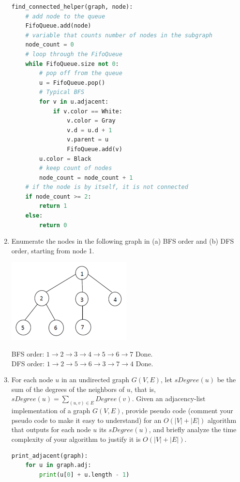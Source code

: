 \documentclass{article}
\begin{document}
\begin{enumerate}
\begin{lstlisting}[language=python]
find_connected_helper(graph, node):
    # add node to the queue
    FifoQueue.add(node)
    # variable that counts number of nodes in the subgraph
    node_count = 0
    # loop through the FifoQueue
    while FifoQueue.size not 0:
        # pop off from the queue
        u = FifoQueue.pop()
        # Typical BFS 
        for v in u.adjacent:
            if v.color == White:
                v.color = Gray
                v.d = u.d + 1
                v.parent = u
                FifoQueue.add(v)
        u.color = Black
        # keep count of nodes
        node_count = node_count + 1
    # if the node is by itself, it is not connected
    if node_count >= 2:
        return 1
    else:
        return 0
            \end{lstlisting}
        \item Enumerate the nodes in the following graph in (a) BFS order and 
        (b) DFS order, starting from node 1. 
            \begin{center}
                \includegraphics{tree1}
            \end{center}
            BFS order: $1 \rightarrow 2 \rightarrow 3 \rightarrow 4 \rightarrow 5 \rightarrow 6 \rightarrow 7$ Done.\\
            DFS order: $1 \rightarrow 2 \rightarrow 5 \rightarrow 6 \rightarrow 3 \rightarrow 7 \rightarrow 4$ Done.
        \item For each node $u$ in an undirected graph $G(V, E)$, let 
        $sDegree(u)$ be the sum of the degrees of the neighbors of $u$, that 
        is, $sDegree(u) = \sum_{(u,v)\in E}Degree(v)$. Given an adjacency-list 
        implementation of a graph $G(V, E)$, provide pseudo code (comment your 
        pseudo code to make it easy to understand) for an $O(|V|+|E|)$ 
        algorithm that outputs for each node $u$ its $sDegree(u)$, and briefly 
        analyze the time complexity of your algorithm to justify it is 
        $O(|V|+|E|)$.
            \begin{lstlisting}[language=python]
print_adjacent(graph):
    for u in graph.adj:
        print(u[0] + u.length - 1)

\end{lstlisting}
\end{enumerate}
\end{document}
